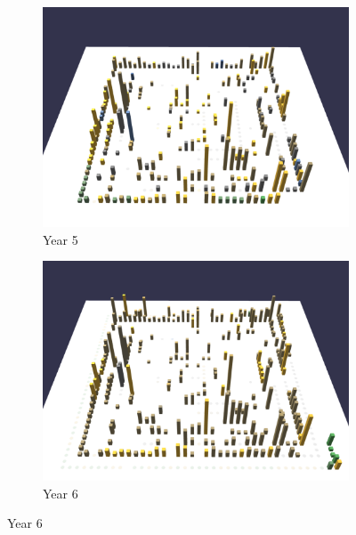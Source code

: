 \begin{figure}[ht]    \ContinuedFloat
    \begin{subfigure}{0.48\textwidth}
        \includegraphics[width=\linewidth]{JetUML_V3S5.png}
        \caption{Year 5} 
        \label{fig:JetUML_V3S5}
    \end{subfigure}\hspace*{\fill}
    \begin{subfigure}{0.48\textwidth}
        \includegraphics[width=\linewidth]{JetUML_V3S6.png}
        \caption{Year 6} 
        \label{fig:JetUML_V3S6}
    \end{subfigure}


\end{figure}
